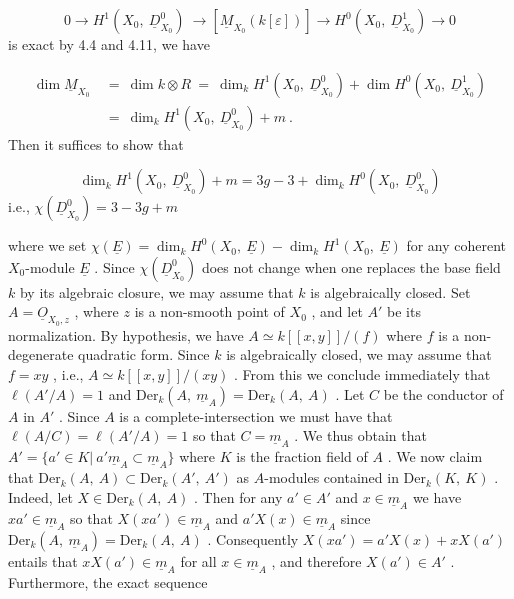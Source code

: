 \begin{equation*}
0 \rightarrow H^1(X_0,\ \underline{D}^0_{X_0})\ \rightarrow [\underline{M}_{X_0}(k[\varepsilon])] \rightarrow H^0(X_0,\ \underline{D}^1_{X_0}) \rightarrow 0
\end{equation*}
is exact by 4.4 and 4.11, we have

\begin{equation*}
\begin{aligned}
\dim \underline{M}_{X_0} \ &= \ \dim k \otimes R \ = \ \dim_k H^1(X_0,\ \underline{D}^0_{X_0}) + \dim H^0(X_0,\ \underline{D}^1_{X_0})\\
&= \ \dim_k H^1(X_0,\ \underline{D}^0_{X_0}) + m \ .
\end{aligned}
\end{equation*}
Then it suffices to show that

\begin{equation*}
\dim_k H^1(X_0,\ \underline{D}^0_{X_0}) + m = 3g - 3 + \dim_k H^0(X_0,\ \underline{D}^0_{X_0})
\end{equation*}
i.e.,  $\chi(\underline{D}^0_{X_0}) = 3 - 3g + m$

where we set  $\chi(\underline{E}) = \dim_k H^0(X_0,\ \underline{E}) - \dim_k H^1(X_0,\ \underline{E})$  for any coherent  $X_0$-module  $\underline{E}$ . Since  $\chi(\underline{D}^0_{X_0})$  does not change when one replaces the base field  $k$  by its algebraic closure, we may assume that  $k$  is algebraically closed. Set  $A = \underline{O}_{X_0,z}$ , where  $z$  is a non-smooth point of  $X_0$ , and let  $A'$  be its normalization. By hypothesis, we have  $A \simeq k[[x,y]]/(f)$  where  $f$  is a non-degenerate quadratic form. Since  $k$  is algebraically closed, we may assume that  $f = xy$ , i.e., $A \simeq k[[x,y]]/(xy)$ . From this we conclude immediately that  $\ell(A'/A) = 1$  and  $\mathrm{Der}_k(A,\ \underline{m}_A) = \mathrm{Der}_k(A,\ A)$ . Let  $C$  be the conductor of  $A$  in  $A'$ . Since $A$ is a complete-intersection we must have that  $\ell(A/C) = \ell(A'/A) = 1$  so that  $C = \underline{m}_A$ . We thus obtain that  $A' = \{a' \in K |\ a'\underline{m}_A \subset \underline{m}_A\}$  where  $K$  is the fraction field of  $A$ . We now claim that  $\mathrm{Der}_k(A,\ A) \subset \mathrm{Der}_k(A',\ A')$  as $A$-modules contained in  $\mathrm{Der}_k(K,\ K)$ . Indeed, let  $X \in \mathrm{Der}_k(A,\ A)$ . Then for any  $a' \in A'$  and
$x \in \underline{m}_A$  we have  $xa' \in \underline{m}_A$  so that  $X(xa') \in \underline{m}_A$  and  $a'X(x) \in \underline{m}_A$  since  $\mathrm{Der}_k(A,\ \underline{m}_A) = \mathrm{Der}_k(A,\ A)$ . Consequently  $X(xa') = a'X(x) + xX(a')$  entails that  $xX(a') \in \underline{m}_A$  for all  $x \in \underline{m}_A$ , and therefore  $X(a') \in A'$ . Furthermore, the exact sequence


